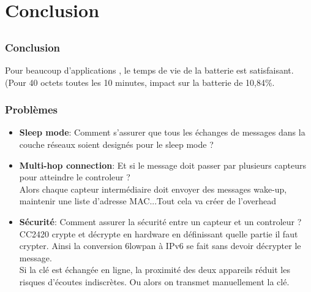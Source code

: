\section{Conclusion}
\subsection{}
\begin{frame}
 \frametitle{Conclusion}
 Pour beaucoup d'applications , le temps de vie de la batterie est satisfaisant.\\
 (Pour 40 octets toutes les 10 minutes, impact sur la batterie de 10,84\%.
\end{frame}

\begin{frame}
 \frametitle{Problèmes}
 \begin{itemize}
  \item \textbf{Sleep mode}: Comment s'assurer que tous les échanges de messages dans la couche réseaux soient designés pour le sleep mode ?
  \item \textbf{Multi-hop connection}: Et si le message doit passer par plusieurs capteurs pour atteindre le controleur ?\\
  Alors chaque capteur intermédiaire doit envoyer des messages wake-up, maintenir une liste d'adresse MAC...Tout cela va créer de l'overhead
  \item \textbf{Sécurité}: Comment assurer la sécurité entre un capteur et un controleur ?\\
  CC2420 crypte et décrypte en hardware en définissant quelle partie il faut crypter.
  Ainsi la conversion 6lowpan à IPv6 se fait sans devoir décrypter le message.\\
  Si la clé est échangée en ligne, la proximité des deux appareils réduit les risques d'écoutes indiscrètes.
  Ou alors on transmet manuellement la clé.
 \end{itemize}
\end{frame}
